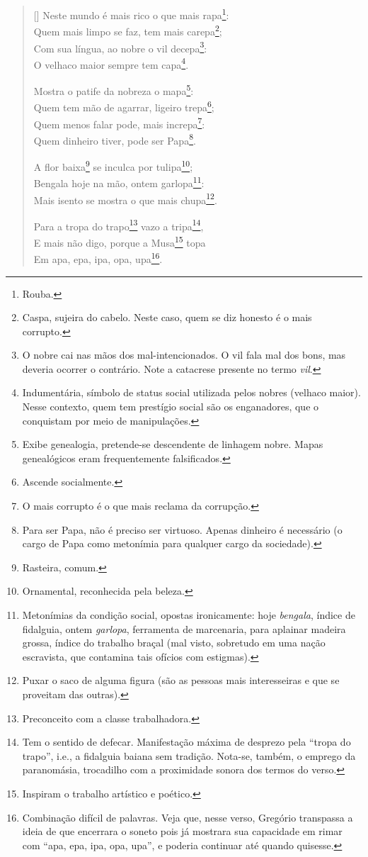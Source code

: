\documentclass[12pt]{book}
\begin{document}
		\begin{verse}[\versewidth]
			Neste mundo é mais rico o que mais rapa\footnote{Rouba.}: \\
			Quem mais limpo se faz, tem mais carepa\footnote{Caspa, sujeira do cabelo. Neste caso, quem se diz honesto é o mais corrupto.}; \\
			Com sua língua, ao nobre o vil decepa\footnote{O nobre cai nas mãos dos mal-intencionados. O vil fala mal dos bons, mas deveria ocorrer o contrário. Note a catacrese presente no termo \textit{vil}.}: \\
			O velhaco maior sempre tem capa\footnote{Indumentária, símbolo de status social utilizada pelos nobres (velhaco maior). Nesse contexto, quem tem prestígio social são os enganadores, que o conquistam por meio de manipulações.}.
			
			Mostra o patife da nobreza o mapa\footnote{Exibe genealogia, pretende-se descendente de linhagem nobre. Mapas genealógicos eram frequentemente falsificados.}: \\
			Quem tem mão de agarrar, ligeiro trepa\footnote{Ascende socialmente.}; \\
			Quem menos falar pode, mais increpa\footnote{O mais corrupto é o que mais reclama da corrupção.}: \\
			Quem dinheiro tiver, pode ser Papa\footnote{Para ser Papa, não é preciso ser virtuoso. Apenas dinheiro é necessário (o cargo de Papa como metonímia para qualquer cargo da sociedade).}. 
			
			A flor baixa\footnote{Rasteira, comum.} se inculca por tulipa\footnote{Ornamental, reconhecida pela beleza.}; \\
			Bengala hoje na mão, ontem garlopa\footnote{Metonímias da condição social, opostas ironicamente: hoje \textit{bengala}, índice de fidalguia, ontem \textit{garlopa}, ferramenta de marcenaria, para aplainar madeira grossa, índice do trabalho braçal (mal visto, sobretudo em uma nação escravista, que contamina tais ofícios com estigmas).}: \\
			Mais isento se mostra o que mais chupa\footnote{Puxar o saco de alguma figura (são as pessoas mais interesseiras e que se proveitam das outras).}.
			
			Para a tropa do trapo\footnote{Preconceito com a classe trabalhadora.} vazo a tripa\footnote{Tem o sentido de defecar. Manifestação máxima de desprezo pela ``tropa do trapo'', i.e., a fidalguia baiana sem tradição. Nota-se, também, o emprego da paranomásia, trocadilho com a proximidade sonora dos termos do verso.}, \\
			E mais não digo, porque a Musa\footnote{Inspiram o trabalho artístico e poético.} topa \\
			Em apa, epa, ipa, opa, upa\footnote{Combinação difícil de palavras. Veja que, nesse verso, Gregório transpassa a ideia de que encerrara o soneto pois já mostrara sua capacidade em rimar com ``apa, epa, ipa, opa, upa'', e poderia continuar até quando quisesse.}. 
		\end{verse}
\end{document}

